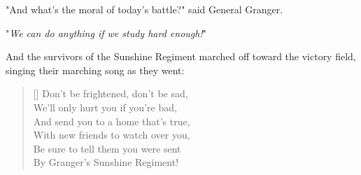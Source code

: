 "And what's the moral of today's battle?" said General Granger.

"\emph{We can do anything if we study hard enough!}"

And the survivors of the Sunshine Regiment marched off toward the victory
field, singing their marching song as they went:

\begin{verse}[\versewidth]
Don't be frightened, don't be sad,\\
We'll only hurt you if you're bad,\\
And send you to a home that's true,\\
With new friends to watch over you,\\
Be sure to tell them you were sent\\
By Granger's Sunshine Regiment!
\end{verse}
